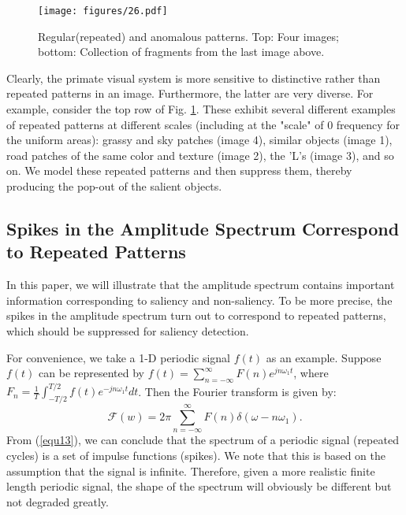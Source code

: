 \documentclass[10pt,journal,cspaper,compsoc]{IEEEtran}
\begin{document}
\begin{figure}[t]
\begin{center}

   \texttt{[image: figures/26.pdf]}
\end{center}
   \caption{Regular(repeated) and anomalous patterns. Top: Four images; bottom: Collection of fragments from the last image above.}
\label{fig:repeatPatt}
\end{figure}

Clearly, the primate visual system is more sensitive to distinctive rather than repeated patterns in an image.  Furthermore, the latter are very diverse. For example, consider the top row of Fig. \ref{fig:repeatPatt}. These exhibit several different examples of repeated patterns at different scales (including at the "scale" of 0 frequency for the uniform areas): grassy and sky patches (image 4), similar objects (image 1), road patches of the same color and texture (image 2), the 'L's (image 3), and so on. We model these repeated patterns and then suppress them, thereby producing the pop-out of the salient objects.


\subsection{Spikes in the Amplitude Spectrum Correspond to Repeated Patterns}

In this paper, we will illustrate that the amplitude spectrum contains important information corresponding to saliency and non-saliency. To be more precise, the spikes in the amplitude spectrum turn out to correspond to repeated patterns, which should be suppressed for saliency detection.

For convenience, we take a 1-D periodic signal $f(t)$ as an example. Suppose $f(t)$  can be represented by $f(t)=\sum_{n=-\infty}^{\infty} F(n)e^{jn\omega_1t}$,  where $F_n=\frac{1}{T}\int_{-T/2}^{T/2}f(t)e^{-jn\omega_1t}dt$. Then the Fourier transform is given by:
\begin{equation}
{\mathcal F}(w)=2\pi\sum_{n=-\infty}^{\infty} F(n)\delta(\omega-n\omega_1).  \label {equ13}
\end {equation}
From (\ref{equ13}), we can conclude that the spectrum of a periodic signal (repeated cycles) is a set of impulse functions (spikes). We note that this is based on the assumption that the signal is infinite. Therefore, given a more realistic finite length periodic signal, the shape of the spectrum will obviously be different but not degraded greatly.
\end{document}
